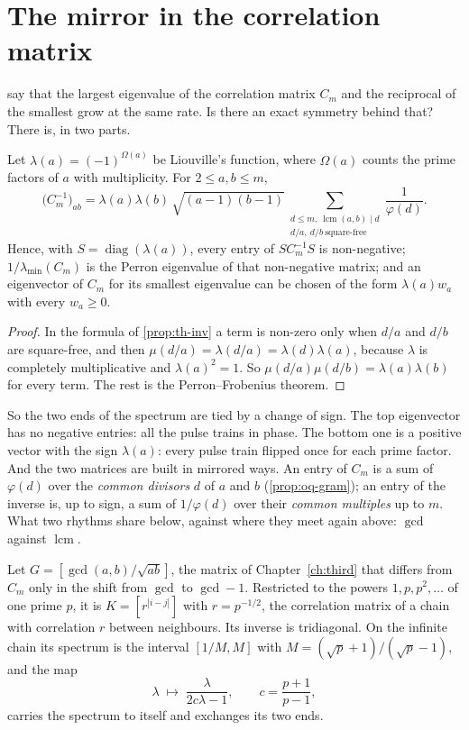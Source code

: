 \section{The mirror in the correlation matrix}\label{sec:18mirror}

 say that the largest eigenvalue of the correlation matrix $C_m$ and the reciprocal
of the smallest grow at the same rate. Is there an exact symmetry behind that? There is, in two parts.

\begin{proposition}\label{prop:18mirror}
Let $\lambda(a)=(-1)^{\Omega(a)}$ be Liouville's function, where $\Omega(a)$ counts the prime factors of
$a$ with multiplicity. For $2\le a,b\le m$,
\[
  \bigl(C_m^{-1}\bigr)_{ab}=\lambda(a)\lambda(b)\,\sqrt{(a-1)(b-1)}
     \sum_{\substack{d\le m,\ \operatorname{lcm}(a,b)\mid d\\ d/a,\ d/b\ \text{square-free}}}\frac{1}{\varphi(d)} .
\]
Hence, with $S=\operatorname{diag}(\lambda(a))$, every entry of $SC_m^{-1}S$ is non-negative; $1/\lambda_{\min}(C_m)$
is the Perron eigenvalue of that non-negative matrix; and an eigenvector of $C_m$ for its smallest
eigenvalue can be chosen of the form $\lambda(a)w_a$ with every $w_a\ge0$.
\end{proposition}

\begin{proof}
In the formula of \cref{prop:th-inv} a term is non-zero only when $d/a$ and $d/b$ are square-free, and then
$\mu(d/a)=\lambda(d/a)=\lambda(d)\lambda(a)$, because $\lambda$ is completely multiplicative and
$\lambda(a)^{2}=1$. So $\mu(d/a)\mu(d/b)=\lambda(a)\lambda(b)$ for every term. The rest is the
Perron--Frobenius theorem.
\end{proof}

So the two ends of the spectrum are tied by a change of sign. The top eigenvector has no negative entries: all the
pulse trains in phase. The bottom one is a positive vector with the sign $\lambda(a)$: every pulse train
flipped once for each prime factor. And the two matrices are built in mirrored ways. An entry of $C_m$ is
a sum of $\varphi(d)$ over the \emph{common divisors} $d$ of $a$ and $b$ (\cref{prop:oq-gram}); an entry of
the inverse is, up to sign, a sum of $1/\varphi(d)$ over their \emph{common multiples} up to $m$. What two
rhythms share below, against where they meet again above: $\gcd$ against $\operatorname{lcm}$.

\begin{proposition}\label{prop:18chain}
Let $G=[\gcd(a,b)/\sqrt{ab}]$, the matrix of Chapter~\ref{ch:third} that differs from $C_m$ only in the shift
from $\gcd$ to $\gcd-1$. Restricted to the powers $1,p,p^{2},\ldots$ of one prime $p$, it is $K=[r^{|i-j|}]$ with
$r=p^{-1/2}$, the correlation matrix of a chain with correlation $r$ between neighbours. Its inverse is
tridiagonal. On the infinite chain its spectrum is the interval $[1/M,M]$ with $M=(\sqrt p+1)/(\sqrt p-1)$,
and the map
\[
  \lambda\;\longmapsto\;\frac{\lambda}{2c\lambda-1},\qquad c=\frac{p+1}{p-1},
\]
carries the spectrum to itself and exchanges its two ends.
\end{proposition}

